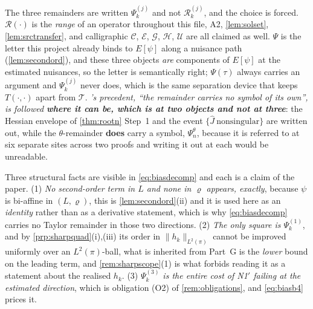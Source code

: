 \begin{lemma}
The three remainders are written $\Psi^{(j)}_k$ and not $\mathcal R^{(j)}_k$, and the choice is
forced. $\mathcal R(\cdot)$ is the \emph{range} of an operator throughout this file, A2, \cref{lem:solset},
\cref{lem:srctransfer}, and calligraphic $\mathcal C$, $\mathcal E$, $\mathcal G$, $\mathcal H$,
$\mathcal U$ are all claimed as well. $\Psi$ is the letter this project already binds to $E[\psi]$ along a
nuisance path (\cref{lem:secondord}), and these three objects \emph{are} components of $E[\psi]$ at the
estimated nuisances, so the letter is semantically right; $\Psi(\tau)$ always carries an argument and
$\Psi^{(j)}_k$ never does, which is the same separation device that keeps
$T(\cdot,\cdot)$ apart from $\mathcal T$. \emph{'s precedent, ``the remainder carries
no symbol of its own'', is followed \textbf{where it can be, which is at two objects and not at three}}:
the Hessian envelope of \cref{thm:rootn} Step~1 and the event $\{\hat J\ \text{nonsingular}\}$ are written
out, while the $\theta$-remainder \textbf{does} carry a symbol, $\Psi^{\theta}_n$, because it is referred to
at six separate sites across two proofs and writing it out at each would be unreadable.

Three structural facts are visible in \eqref{eq:biasdecomp} and each is a claim of the paper.
\textup{(1)} \emph{No second-order term in $L$ and none in $\varrho$ appears, exactly}, because $\psi$ is
bi-affine in $(L,\varrho)$, this is \cref{lem:secondord}\textup{(ii)} and it is used here as an
\emph{identity} rather than as a derivative statement, which is why \eqref{eq:biasdecomp} carries no Taylor
remainder in those two directions. \textup{(2)} \emph{The only square is $\Psi^{(1)}_k$}, and by
\cref{prp:sharpquad}\textup{(i)},\textup{(iii)} its order in $\|h_k\|_{L^{2}(\pi)}$ cannot be improved
uniformly over an $L^{2}(\pi)$-ball, what is inherited from Part~G is the \emph{lower} bound on the
leading term, and \cref{rem:sharpscope}\textup{(1)} is what forbids reading it as a statement about the
realised $h_k$. \textup{(3)} \emph{$\Psi^{(3)}_k$ is the entire cost of N1$'$ failing at the estimated
direction}, which is obligation \textup{(O2)} of \cref{rem:obligations}, and \eqref{eq:biasb4} prices it.
\end{lemma}

